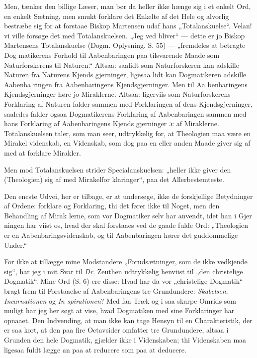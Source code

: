 \documentclass[12pt]{book}
\newcommand{\opage}[1]{\marginnote{\footnotesize\textit{[#1]}}}
\begin{document}
Men, tænker den billige Læser, man bør da heller ikke
hænge sig i et enkelt Ord, en enkelt Sætning, men smukt
forklare det Enkelte af det Hele og alvorlig bestræbe sig for
at forstaae Biskop Martensen udaf hans „Totalanskuelse“.
Velan! vi ville forsøge det med Totalanskuelsen. „Jeg ved\-%
bliver“ --- dette er jo Biskop Martensens Totalanskuelse
(Dogm. Oplysning. S. 55) --- „fremdeles at betragte Dog\-%
matikerens Forhold til Aabenbaringen paa tilsvarende Maade
som Naturforskerens til Naturen.“ Altsaa: saalidt som
Naturforskeren kan adskille Naturen fra Naturens Kjends\-%
gjerninger, ligesaa lidt kan Dogmatikeren adskille Aabenba\-%
\opage{84}\setcounter{footnote}{0}%
ringen fra Aabenbaringens Kjendsgjerninger. Men til Aa\-%
benbaringens Kjendsgjerninger høre jo Miraklerne. Altsaa:
ligerviis som Naturforskerens Forklaring af Naturen falder
sammen med Forklaringen af dens Kjendsgjerninger, saaledes
falder ogsaa Dogmatikerens Forklaring af Aabenbaringen
sammen med hans Forklaring af Aabenbaringens Kjends\-%
gjerninger ɔ: af Miraklerne. Totalanskuelsen taler, som man
seer, udtrykkelig for, at Theologien maa være en Mirakel\-%
videnskab, en Videnskab, som dog paa en eller anden Maade
giver sig af med at forklare Mirakler.

Men mod Totalanskuelsen strider Specialanskuelsen:
„heller ikke giver den (Theologien) sig af med Mirakelfor\-%
klaringer“, paa det Allerbestemteste.

Den eneste Udvei, her er tilbage, er at undersøge, ikke
de forskjellige Betydninger af Ordene: forklare og Forklaring,
thi det fører ikke til Noget, men den Behandling af Mirak\-%
lerne, som vor Dogmatiker selv har anvendt, idet han i Gjer\-%
ningen har viist os, hvad der skal forstaaes ved de gaade\-%
fulde Ord: „Theologien er en Aabenbaringsvidenskab, og til
Aabenbaringen hører det guddommelige Under.“

For ikke at tillægge mine Modstandere „Forudsætninger,
som de ikke vedkjende sig“, har jeg i mit Svar til \textit{Dr.}
Zeuthen udtrykkelig henviist til „den christelige Dogmatik“.
Mine Ord (S. 6) ere disse: Hvad har da vor „christelige
Dogmatik“ bragt frem til Forstaaelse af Aabenbaringens tre
Grundundere: \emph{Skabelsen}, \emph{Incarnationen} og \emph{In\-%
spirationen}? Med faa Træk og i saa skarpe Omrids
som muligt har jeg her søgt at vise, hvad Dogmatiken med
sine Forklaringer har opnaaet. Den Indvending, at man
ikke kan tage Hensyn til en Charakteristik, der er saa kort,
at den paa fire Octavsider omfatter tre Grundundere, altsaa
i Grunden den hele Dogmatik, gjælder ikke i Videnskaben;
thi Videnskaben maa ligesaa fuldt lægge an paa at reducere
som paa at deducere.
\end{document}
